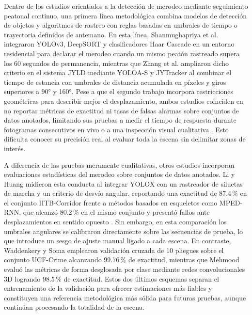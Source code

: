 \documentclass[runningheads]{llncs}
\begin{document}
Dentro de los estudios orientados a la detección de merodeo mediante seguimiento peatonal continuo, una primera línea metodológica combina modelos de detección de objetos y algoritmos de rastreo con reglas basadas en umbrales de tiempo o trayectoria definidos de antemano. En esta línea, Shanmughapriya et al. \cite{m2022} integraron YOLOv3, DeepSORT y clasificadores Haar Cascade en un entorno residencial para declarar el merodeo cuando un mismo peatón rastreado supera los 60 segundos de permanencia, mientras que Zhang et al. \cite{zhang2023} ampliaron dicho criterio en el sistema JYLD mediante YOLOA-S y JYTracker al combinar el tiempo de estancia con umbrales de distancia acumulada en píxeles y giros superiores a 90° y 160°. Pese a que el segundo trabajo incorpora restricciones geométricas para describir mejor el desplazamiento, ambos estudios coinciden en no reportar métricas de exactitud ni tasas de falsas alarmas sobre conjuntos de datos anotados, limitando sus pruebas a medir el tiempo de respuesta durante fotogramas consecutivos en vivo \cite{m2022} o a una inspección visual cualitativa \cite{zhang2023}. Esto dificulta conocer su precisión real al evaluar toda la escena sin delimitar zonas de interés.

A diferencia de las pruebas meramente cualitativas, otros estudios incorporan evaluaciones estadísticas del merodeo sobre conjuntos de datos anotados. Li y Huang \cite{li2024} midieron esta conducta al integrar YOLOX con un rastreador de siluetas de marcha y un criterio de desvío angular, reportando una exactitud de 87.4\,\% en el conjunto IITB-Corridor frente a métodos basados en esqueletos como MPED-RNN, que alcanzó 80.2\,\% en el mismo conjunto y presentó fallos ante desplazamientos en sentido opuesto \cite{jiang2022,li2024}. Sin embargo, en esta comparación los umbrales angulares se calibraron directamente sobre las secuencias de prueba, lo que introduce un sesgo de ajuste manual ligado a cada escena. En contraste, Waddenkery y Soma \cite{waddenkery2024} emplearon validación cruzada de 10 pliegues sobre el conjunto UCF-Crime alcanzando 99.76\,\% de exactitud, mientras que Mehmood \cite{mehmood2021} evaluó las métricas de forma desglosada por clase mediante redes convolucionales 3D logrando 98.5\,\% de exactitud. Estos dos últimos esquemas separan el entrenamiento de la validación para ofrecer estimaciones más fiables y constituyen una referencia metodológica más sólida para futuras pruebas, aunque continúan procesando la totalidad de la escena.
\end{document}

